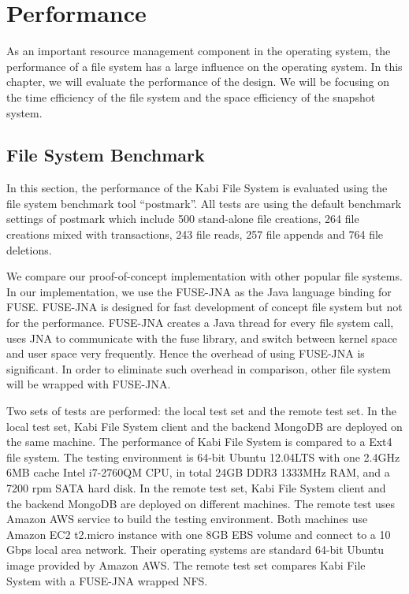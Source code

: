 \chapter{Performance}
\label{chap:perform}

    As an important resource management component in the operating system, the performance of a file system has a large influence on the operating system. In this chapter, we will evaluate the performance of the design. We will be focusing on the time efficiency of the file system and the space efficiency of the snapshot system.

\section{File System Benchmark}

    In this section, the performance of the Kabi File System is evaluated using the file system benchmark tool ``postmark''\cite{postmark}. All tests are using the default benchmark settings of postmark which include 500 stand-alone file creations, 264 file creations mixed with transactions, 243 file reads, 257 file appends and 764 file deletions.

    We compare our proof-of-concept implementation with other popular file systems. In our implementation, we use the FUSE-JNA\cite{fusejna}  as the Java language binding for FUSE. FUSE-JNA is designed for fast development of concept file system but not for the performance. FUSE-JNA creates a Java thread for every file system call, uses JNA to communicate with the fuse library, and switch between kernel space and user space very frequently. Hence the overhead of using FUSE-JNA is significant. In order to eliminate such overhead in comparison, other file system will be wrapped with FUSE-JNA.

    Two sets of tests are performed: the local test set and the remote test set. In the local test set, Kabi File System client and the backend MongoDB are deployed on the same machine. The performance of Kabi File System is compared to a Ext4 file system. The testing environment is 64-bit Ubuntu 12.04LTS with one 2.4GHz 6MB cache Intel i7-2760QM CPU, in total 24GB DDR3 1333MHz RAM, and a 7200 rpm SATA hard disk. In the remote test set, Kabi File System client and the backend MongoDB are deployed on different machines. The remote test uses Amazon AWS service to build the testing environment. Both machines use Amazon EC2 t2.micro instance with one 8GB EBS volume and connect to a 10 Gbps local area network. Their operating systems are standard 64-bit Ubuntu image provided by Amazon AWS. The remote test set compares Kabi File System with a FUSE-JNA wrapped NFS. 

